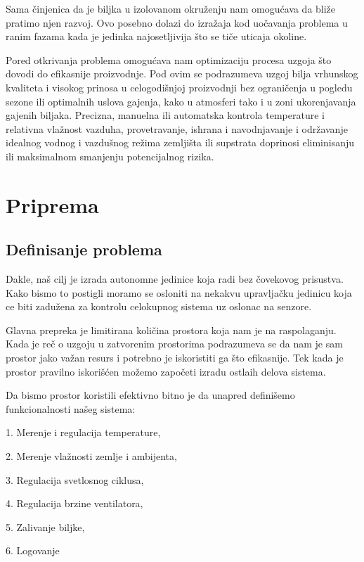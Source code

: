 \documentclass[a4paper,11pt]{book}
\begin{document}
\noindent Sama činjenica da je biljka u izolovanom okruženju nam omogućava da bliže pratimo njen razvoj. Ovo posebno dolazi do izražaja kod uočavanja problema u ranim fazama kada je jedinka najosetljivija što se tiče uticaja okoline.

Pored otkrivanja problema omogućava nam optimizaciju procesa uzgoja što dovodi do efikasnije proizvodnje. Pod ovim se podrazumeva uzgoj bilja vrhunskog kvaliteta i visokog prinosa u celogodišnjoj proizvodnji bez ograničenja u pogledu sezone ili optimalnih uslova gajenja, kako u atmosferi tako i u zoni ukorenjavanja gajenih biljaka. Precizna, manuelna ili automatska kontrola temperature i relativna vlažnost vazduha, provetravanje, ishrana i navodnjavanje i održavanje idealnog vodnog i vazdušnog režima zemljišta ili supstrata doprinosi eliminisanju ili maksimalnom smanjenju potencijalnog rizika.

\chapter{Priprema}

\section{Definisanje problema}
Dakle, naš cilj je izrada autonomne jedinice koja radi bez čovekovog prisustva. Kako bismo to postigli moramo se osloniti na nekakvu upravljačku jedinicu koja ce biti zadužena za kontrolu celokupnog sistema uz oslonac na senzore. 

Glavna prepreka je limitirana količina prostora koja nam je na raspolaganju. Kada je reč o uzgoju u zatvorenim prostorima podrazumeva se da nam je sam prostor jako važan resurs i potrebno je iskoristiti ga što efikasnije. Tek kada je prostor pravilno iskorišćen možemo započeti izradu ostlaih delova sistema.

Da bismo prostor koristili efektivno bitno je da unapred definišemo funkcionalnosti našeg sistema: 

\hrulefill

1. Merenje i regulacija temperature,

2. Merenje vlažnosti zemlje i ambijenta,

3. Regulacija svetlosnog ciklusa,

4. Regulacija brzine ventilatora,

5. Zalivanje biljke,

6. Logovanje 

\hrulefill
\end{document}
